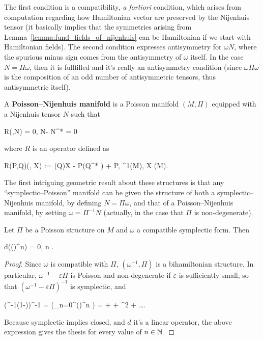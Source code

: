 \documentclass[main.tex]{subfiles}
\begin{document}
The first condition is a compatibility, \emph{a fortiori} condition, which arises from computation regarding how Hamiltonian vector are preserved by the Nijenhuis tensor (it basically implies that the symmetries arising from Lemma~\ref{lemma:fund_fields_of_nijenhuis} can be Hamiltonian if we start with Hamiltonian fields). The second condition expresses antisymmetry for $\omega N$, where the spurious minus sign comes from the antisymmetry of $\omega$ itself. In the case $N=\Pi\omega$, then it is fullfilled and it's really an antisymmetry condition (since $\omega\Pi\omega$ is the composition of an odd number of antisymmetric tensors, thus antisymmetric itself).

\begin{definition}
	A \textbf{Poisson--Nijenhuis manifold} is a Poisson manifold $(M,\Pi)$ equipped with a Nijenhuis tensor $N$ such that
	\begin{eqalign}
	\label{eq:poisson_nijenhuis_conditions}
		R(\Pi,N) = 0, \quad N\Pi - \Pi N^* = 0
	\end{eqalign}
	where $R$ is an operator defined as
	\begin{eqalign}
		R(P,Q)(\alpha, X) := (Q)X - P(Q^* \alpha) + P\alpha, \quad \alpha \in \Omega^1(M), X \in \fields(M).
	\end{eqalign}
\end{definition}

The first intriguing geometric result about these structures is that any ``symplectic--Poisson'' manifold can be given the structure of both a symplectic--Nijenhuis manifold, by defining $N=\Pi\omega$, and that of a Poisson--Nijenhuis manifold, by setting $\omega = \Pi^{-1}N$ (actually, in the case that $\Pi$ is non-degenerate).

\begin{lemma}
\label{lemma:powers_of_comp_are_closed}
	Let $\Pi$ be a Poisson structure on $M$ and $\omega$ a compatible symplectic form. Then
	\begin{eqalign}
		d(\omega(\Pi \omega)^n) = 0, \quad \forall n \in \N.
	\end{eqalign}
\end{lemma}
\begin{proof}
	Since $\omega$ is compatible with $\Pi$, $(\omega^{-1}, \Pi)$ is a bihamiltonian structure. In particular, $\omega^{-1}-\varepsilon \Pi$ is Poisson and non-degenerate if $\varepsilon$ is sufficiently small, so that $(\omega^{-1}-\varepsilon \Pi)^{-1}$ is symplectic, and
	\begin{eqalign}
		(\omega^{-1}(1-\varepsilon \omega \Pi))^{-1} = \left(\sum_{n=0}^\infty (\varepsilon \omega \Pi)^n \right) \omega = \omega + \varepsilon \omega \Pi \omega + \varepsilon^2 \omega \Pi \omega \Pi \omega + \ldots.
	\end{eqalign}
	Because symplectic implies closed, and $d$ it's a linear operator, the above expression gives the thesis for every value of $n \in \mathbb{N}$.
\end{proof}
\end{document}
